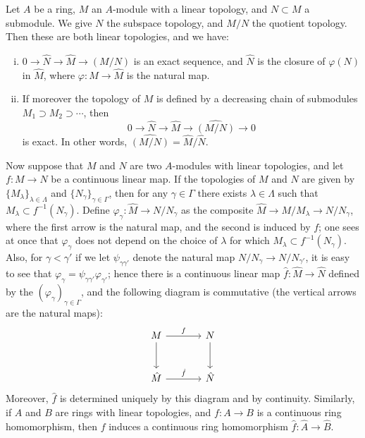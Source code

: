 \begin{theorem}\label{thm:8.1}
Let $A$ be a ring, $M$ an $A$-module with a linear topology, and
$N \subset M$ a submodule. We give $N$ the subspace topology, and $M/N$ the
quotient topology. Then these are both linear topologies, and we have:
\begin{enumerate}[(i)]
  \item $0 \to \hat{N} \to \hat{M} \to \widehat{(M/N)}$ is an exact sequence, and $\hat{N}$ is the closure
        of $\varphi(N)$ in $\hat{M}$, where $\varphi\colon M \to \hat{M}$ is the natural map.
  \item If moreover the topology of $M$ is defined by a decreasing chain of
        submodules $M_1 \supset M_2 \supset \cdots$, then
        \[
          0 \to \hat{N} \to \hat{M} \to \widehat{(M/N)} \to 0
        \]
        is exact. In other words, $\widehat{(M/N)} = \hat{M}/\hat{N}$.
\end{enumerate}
\end{theorem}

Now suppose that $M$ and $N$ are two $A$-modules with linear topologies,
and let $f\colon M \to N$ be a continuous linear map. If the topologies of $M$ and
$N$ are given by $\{M_\lambda\}_{\lambda \in \Lambda}$ and $\{N_\gamma\}_{\gamma \in \Gamma}$, then for any $\gamma \in \Gamma$ there
exists $\lambda \in \Lambda$ such that $M_\lambda \subset f^{-1}(N_\gamma)$.
Define $\varphi_\gamma\colon \hat{M} \to N/N_\gamma$ as the composite
$\hat{M} \to M/M_\lambda \to N/N_\gamma$, where the first arrow is the natural
map, and the second is induced by $f$; one sees at once that $\varphi_\gamma$ does not
depend on the choice of $\lambda$ for which $M_\lambda \subset f^{-1}(N_\gamma)$.
Also, for $\gamma < \gamma'$ if we
let $\psi_{\gamma\gamma'}$ denote the natural map $N/N_\gamma \to N/N_{\gamma'}$, it is easy to see that
$\varphi_\gamma = \psi_{\gamma\gamma'} \varphi_{\gamma'}$; hence there is a continuous linear map $\hat{f}\colon \hat{M} \to \hat{N}$
defined by the $(\varphi_\gamma)_{\gamma \in \Gamma}$, and the following diagram is commutative (the
vertical arrows are the natural maps):
\[
  \begin{tikzcd}[column sep=large, row sep=large]
    M \arrow[r, "f"] \arrow[d] & N \arrow[d] \\
    \hat{M} \arrow[r, "\hat{f}"] & \hat{N}
  \end{tikzcd}
\]
Moreover, $\hat{f}$ is determined uniquely by this diagram and by continuity.
Similarly, if $A$ and $B$ are rings with linear topologies, and $f\colon A \to B$ is
a continuous ring homomorphism, then $f$ induces a continuous ring
homomorphism $\hat{f}\colon \hat{A} \to \hat{B}$.

